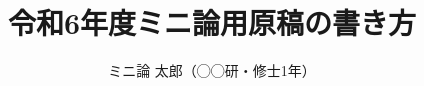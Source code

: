 \documentclass{/workdir/classes/minithesis2024j}
\begin{document}
\title{令和6年度ミニ論用原稿の書き方}
\author{ミニ論 太郎（◯◯研・修士1年）}

\setlength{\baselineskip}{4.4mm}

\maketitle

\thispagestyle{empty}
\pagestyle{empty}









\end{document}
